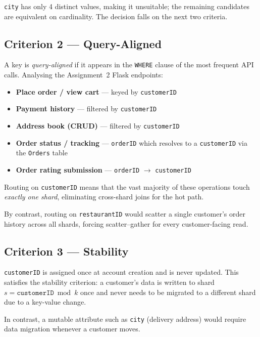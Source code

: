 \documentclass[12pt, a4paper]{article}
\renewcommand{\_}{\plainunderscore\allowbreak}
\begin{document}
\noindent \texttt{city} has only 4 distinct values, making it unsuitable; the
remaining candidates are equivalent on cardinality. The decision falls on
the next two criteria.

\subsection{Criterion 2 --- Query-Aligned}

A key is \emph{query-aligned} if it appears in the \texttt{WHERE} clause of
the most frequent API calls. Analysing the Assignment~2 Flask endpoints:

\begin{itemize}[leftmargin=*]
  \item \textbf{Place order / view cart} --- keyed by \texttt{customerID}
  \item \textbf{Payment history} --- filtered by \texttt{customerID}
  \item \textbf{Address book (CRUD)} --- filtered by \texttt{customerID}
  \item \textbf{Order status / tracking} --- \texttt{orderID} which resolves
        to a \texttt{customerID} via the \texttt{Orders} table
  \item \textbf{Order rating submission} --- \texttt{orderID}
        $\to$ \texttt{customerID}
\end{itemize}

Routing on \texttt{customerID} means that the vast majority of these
operations touch \emph{exactly one shard}, eliminating cross-shard joins
for the hot path.

By contrast, routing on \texttt{restaurantID} would scatter a single
customer's order history across all shards, forcing scatter--gather for
every customer-facing read.

\subsection{Criterion 3 --- Stability}

\texttt{customerID} is assigned once at account creation and is never
updated. This satisfies the stability criterion: a customer's data is
written to shard $s = \texttt{customerID} \bmod k$ once and never needs
to be migrated to a different shard due to a key-value change.

In contrast, a mutable attribute such as \texttt{city} (delivery address)
would require data migration whenever a customer moves.
\end{document}
